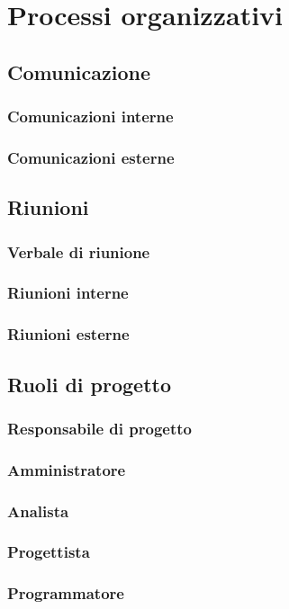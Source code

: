 \documentclass[main.tex]{subfiles}
\begin{document}
\chapter{Processi organizzativi}

\section{Comunicazione}
\subsection{Comunicazioni interne}
\subsection{Comunicazioni esterne}

\section{Riunioni}
\subsection{Verbale di riunione}
\subsection{Riunioni interne}
\subsection{Riunioni esterne}

\section{Ruoli di progetto}
\subsection{Responsabile di progetto}
\subsection{Amministratore}
\subsection{Analista}
\subsection{Progettista}
\subsection{Programmatore}
\end{document}
